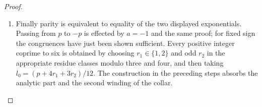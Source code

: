 \begin{proof}
\begin{enumerate}[label=\arabic*.,leftmargin=*]
\item Finally parity is equivalent to equality of the two displayed exponentials. Passing from $p$ to $-p$ is effected by $a=-1$ and the same proof; for fixed sign the congruences have just been shown sufficient. Every positive integer coprime to six is obtained by choosing $r_1\in\{1,2\}$ and odd $r_2$ in the appropriate residue classes modulo three and four, and then taking $l_0=(p+4r_1+3r_2)/12$. The construction in the preceding steps absorbs the analytic part and the second winding of the collar.
\end{enumerate}
\end{proof}